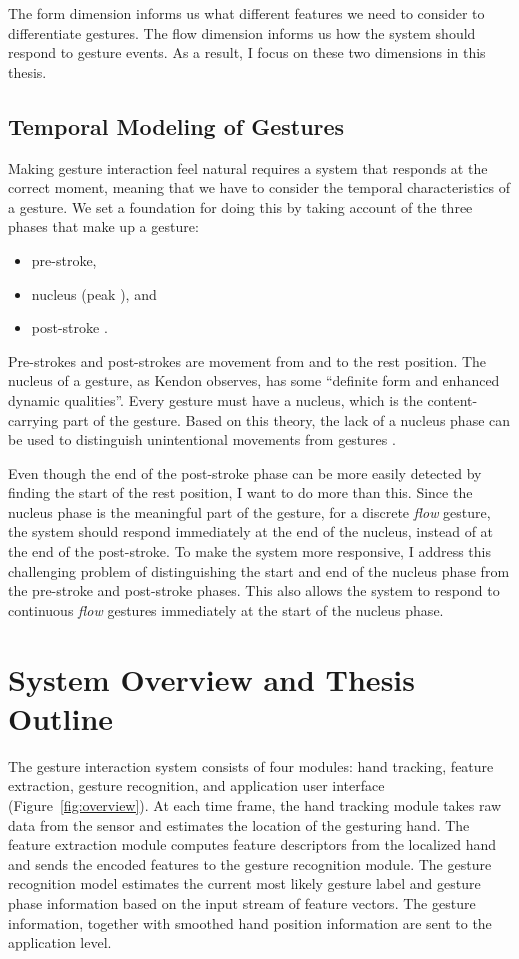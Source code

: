 The form dimension informs us what different features we need to
consider to differentiate gestures.
The flow dimension informs us how the system should respond to gesture events.
As a result, I focus on these two dimensions in this thesis.

\subsection{Temporal Modeling of Gestures}\label{sec:temporal-model}
Making gesture interaction feel natural requires a system that responds at the
correct moment, meaning that we have to consider the temporal
characteristics of a gesture. We set a foundation for doing this by taking
account of the three phases that make up a gesture:
\begin{itemize}
  \item pre-stroke,
  \item nucleus (peak \cite{mcneill82}), and
  \item post-stroke \cite{Pavlovic97}.
\end{itemize}
Pre-strokes and post-strokes are movement from and to the
rest position. The nucleus of a gesture,
as Kendon \cite{kendon86} observes, has some ``definite form and enhanced dynamic
qualities''. Every gesture must have a nucleus, which is the content-carrying
part of the gesture. Based on this theory, the lack of a nucleus phase can
be used to distinguish unintentional movements from gestures .

Even though the end of the
post-stroke phase can be more easily detected by finding the start of the
rest position, I want to do more than this. Since the nucleus phase is the
meaningful part of the gesture, for a discrete \textit{flow} gesture, the
system should respond immediately at the end of the nucleus, instead of at the
end of the post-stroke. To make the system more responsive, I address this challenging problem of distinguishing the start and end of the
 nucleus phase from the pre-stroke and post-stroke phases. This also allows the system to respond to continuous
\textit{flow} gestures immediately at the start of the nucleus phase.

\section{System Overview and Thesis Outline}
The gesture interaction system consists of four modules: hand tracking, 
feature extraction, gesture recognition, and application user interface
(Figure~\ref{fig:overview}). At each time frame, the
hand tracking module takes raw data from the sensor and estimates the location
of the gesturing hand. The feature extraction module computes feature
descriptors from the localized hand and sends the encoded features to the
gesture recognition module.
The gesture recognition model estimates the current most likely gesture label and gesture phase information based on the input stream of
feature vectors. The gesture information, 
together with smoothed hand position information are sent to the application
level. 


